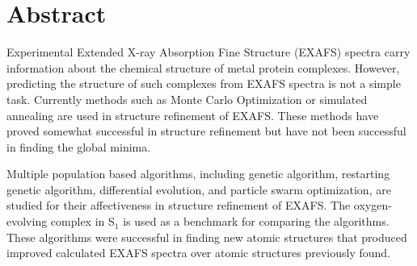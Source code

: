 \thispagestyle{empty}
\section*{Abstract}
\begin{doublespace}
Experimental Extended X-ray Absorption Fine Structure (EXAFS) spectra carry information about the chemical structure of metal protein complexes. However, predicting the structure of such complexes from EXAFS spectra is not a simple task. Currently methods such as Monte Carlo Optimization or simulated annealing are used in structure refinement of EXAFS. These methods have proved somewhat successful in structure refinement but have not been successful in finding the global minima.

Multiple population based algorithms, including genetic algorithm, restarting genetic algorithm, differential evolution, and particle swarm optimization, are studied for their affectiveness in structure refinement of EXAFS. The oxygen-evolving complex in S$_{1}$ is used as a benchmark for comparing the algorithms. These algorithms were successful in finding new atomic structures that produced improved calculated EXAFS spectra over atomic structures previously found.

\end{doublespace}   

